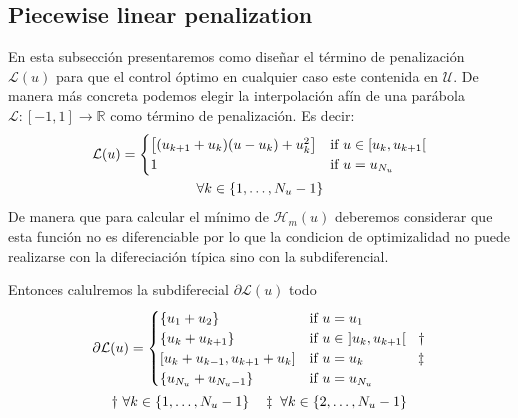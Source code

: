 \subsection{Piecewise linear penalization}

En esta subsección presentaremos como diseñar el término de penalización $\mathcal{L}(u)$ para que el control óptimo en cualquier caso este contenida en $\mathcal{U}$. 
%
De manera más concreta podemos elegir la interpolación afín de una parábola  $\mathcal{L}:[-1,1] \rightarrow \mathbb{R}$ como término de penalización. Es decir:  
\begin{gather}\label{PLP}
    {\mathcal{L}(u)} = \begin{cases}
        \big[ (u_{k+1}+u_{k}) (u-u_k) + u_k^2 \big] & \text{if}  u \in [u_k,u_{k+1}[ \\
        1 & \text{if} \ u = u_{N_u} 
    \end{cases} \\
    \notag \forall k \in \{1,\dots,N_u-1\}
\end{gather}
%
De manera que para calcular el mínimo de $\mathcal{H}_m(u)$ deberemos considerar que esta función no es diferenciable por lo que la condicion de optimizalidad no puede realizarse con la difereciación típica sino con la subdiferencial.

Entonces calulremos la subdiferecial $\partial \mathcal{L}(u)$ todo 
\begin{gather}
        \partial\mathcal{L}(u)= \begin{cases}
            \{u_1 + u_2  \}   & \text{if} \ u = u_1 \\
            \{u_k + u_{k+1}\}  & \text{if} \ u \in \ ]u_k,u_{k+1}[ \hspace{0.9em} \dagger\\
            [u_k+u_{k-1} ,  u_{k+1}+u_k] & \text{if} \ u = u_k \hspace{3.9em} \ddagger \\
            \{u_{N_u} + u_{N_u-1}  \} & \text{if} \ u = u_{N_u} 
       \end{cases} \\
       \notag \dagger \ \forall k \in \{1,\dots,N_u-1\} \hspace{1em}
       \notag \ddagger  \ \forall k \in \{2,\dots,N_u-1\}
\end{gather} 

